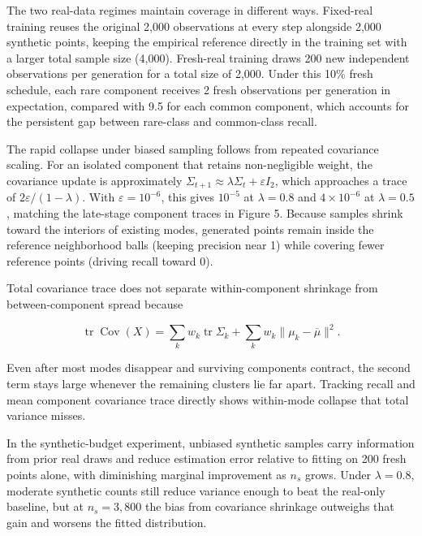 \documentclass[11pt,a4paper]{article}
\begin{document}
The two real-data regimes maintain coverage in different ways. Fixed-real training reuses the original 2,000 observations at every step alongside 2,000 synthetic points, keeping the empirical reference directly in the training set with a larger total sample size (4,000). Fresh-real training draws 200 new independent observations per generation for a total size of 2,000. Under this 10\% fresh schedule, each rare component receives 2 fresh observations per generation in expectation, compared with 9.5 for each common component, which accounts for the persistent gap between rare-class and common-class recall.


The rapid collapse under biased sampling follows from repeated covariance scaling. For an isolated component that retains non-negligible weight, the covariance update is approximately $\Sigma_{t+1}\approx\lambda\Sigma_t+\varepsilon I_2$, which approaches a trace of $2\varepsilon/(1-\lambda)$. With $\varepsilon=10^{-6}$, this gives $10^{-5}$ at $\lambda=0.8$ and $4\times10^{-6}$ at $\lambda=0.5$, matching the late-stage component traces in Figure 5. Because samples shrink toward the interiors of existing modes, generated points remain inside the reference neighborhood balls (keeping precision near 1) while covering fewer reference points (driving recall toward 0).


Total covariance trace does not separate within-component shrinkage from between-component spread because


\begin{equation}
\operatorname{tr}\operatorname{Cov}(X)=\sum_k w_k\operatorname{tr}\Sigma_k+\sum_k w_k\|\mu_k-\overline\mu\|^2.
\end{equation}

Even after most modes disappear and surviving components contract, the second term stays large whenever the remaining clusters lie far apart. Tracking recall and mean component covariance trace directly shows within-mode collapse that total variance misses.


In the synthetic-budget experiment, unbiased synthetic samples carry information from prior real draws and reduce estimation error relative to fitting on 200 fresh points alone, with diminishing marginal improvement as $n_s$ grows. Under $\lambda=0.8$, moderate synthetic counts still reduce variance enough to beat the real-only baseline, but at $n_s=3,800$ the bias from covariance shrinkage outweighs that gain and worsens the fitted distribution.


\clearpage
\end{document}
